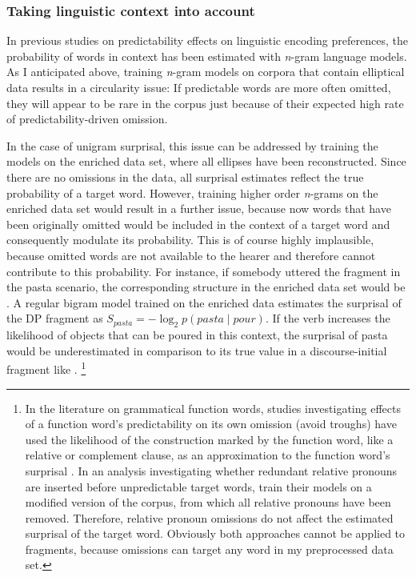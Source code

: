 \subsubsection{Taking linguistic context into account}
\label{sec:scripts-production-surprisal-context}

In previous studies on predictability effects on linguistic encoding preferences, the probability of words in context has been estimated with \textit{n}-gram language models. As I anticipated above, training \textit{n}-gram models on corpora that contain elliptical data results in a circularity issue: If predictable words are more often omitted, they will appear to be rare in the corpus just because of their expected high rate of predictability-driven omission. 

\newpage
\noindent In the case of unigram surprisal, this issue can be addressed by training the models on the enriched data set, where all ellipses have been reconstructed. Since there are no omissions in the data, all surprisal estimates reflect the true probability of a target word. However, training higher order \textit{n}-grams on the enriched data set would result in a further issue, because now words that have been originally omitted would be included in the context of a target word and consequently modulate its probability. This is of course highly implausible, because omitted words are not available to the hearer and therefore cannot contribute to this probability. For instance, if somebody uttered the fragment \Next[a] in the pasta scenario, the corresponding structure in the enriched data set would be \Next[b]. A regular bigram model trained on the enriched data estimates the surprisal of the DP fragment as $S_{pasta} = -\log_2 p(pasta\mathbin{|}pour)$. If the verb increases the likelihood of objects that can be poured in this context, the surprisal of pasta would be underestimated in comparison to its true value in a discourse-initial fragment like \Next[a].%
%
\footnote{In the literature on grammatical function words, studies investigating effects of a function word's predictability on its own omission (avoid troughs) have used the likelihood of the construction marked by the function word, like a relative  or complement clause, as an approximation to the function word's surprisal \citep{levy.jaeger2007, jaeger2010}. In an analysis investigating whether redundant relative pronouns are inserted before unpredictable target words, \citet{levy.jaeger2007} train their models on a modified version of the corpus, from which all relative pronouns have been removed. Therefore, relative pronoun omissions do not affect the estimated surprisal of the target word. Obviously both approaches cannot be applied to fragments, because omissions can target any word in my preprocessed data set.}\afterfn%
%

